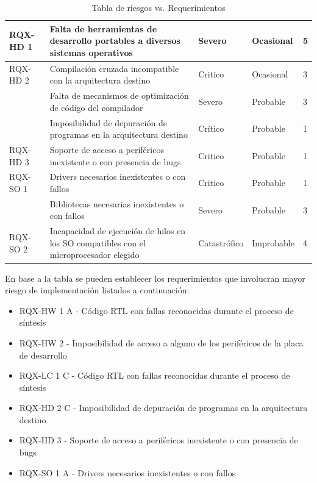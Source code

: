 \begin{table}[!h]
\begin{tabular}{ p{2.0cm} p{7.5cm} p{2cm} p{2.5cm} p{1.5cm} }
		\hline
		RQX-HD 1& Falta de herramientas de desarrollo portables a diversos sistemas operativos & Severo  &  Ocasional & 5\\
		\hline		
		RQX-HD 2& Compilación cruzada incompatible con la arquitectura destino  & Critico &  Ocasional & 3\\
		\hline
				& Falta de mecanismos de optimización de código del compilador  & Severo  &  Probable & 3\\
		\hline
				& Imposibilidad de depuración de programas en la arquitectura destino& Crítico  &  Probable & 1\\
		\hline
		RQX-HD 3& Soporte de acceso a periféricos inexistente o con presencia de bugs & Critico &  Probable & 1\\
		\hline
		RQX-SO 1& Drivers necesarios inexistentes o con fallos & Critico &  Probable & 1\\
		\hline
				& Bibliotecas necesarias inexistentes o con fallos & Severo &  Probable & 3\\
		\hline
		RQX-SO 2& Incapacidad de ejecución de hilos en los SO compatibles con el microprocesador elegido & Catastrófico & Improbable & 4\\
		\hline
		\end{tabular}
		\caption{Tabla de riesgos vs. Requerimientos}
		\label{tab:riegos}
		\end{table}
	
		En base a la tabla se pueden establecer los requerimientos que involucran mayor riesgo de implementación listados a continuación:
		
		\begin{itemize}
		    \item RQX-HW 1 A - Código RTL con fallas reconocidas durante el proceso de síntesis
		    \item RQX-HW 2   - Imposibilidad de acceso a alguno de los periféricos de la placa de desarrollo
			\item RQX-LC 1 C - Código RTL con fallas reconocidas durante el proceso de síntesis
			\item RQX-HD 2 C - Imposibilidad de depuración de programas en la arquitectura destino
			\item RQX-HD 3   - Soporte de acceso a periféricos inexistente o con presencia de bugs
			\item RQX-SO 1 A - Drivers necesarios inexistentes o con fallos
	    \end{itemize}
	    
